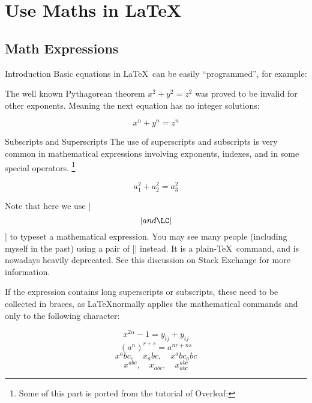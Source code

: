 \section{Use Maths in \LaTeX}

\subsection{Math Expressions}

\begin{frame}[fragile]{Introduction}
Basic equations in \LaTeX\ can be easily ``programmed'', for example: 
\begin{latexexample}
The well known Pythagorean theorem \(x^2 + y^2 = z^2\) was 
proved to be invalid for other exponents. 
Meaning the next equation has no integer solutions:

\[ x^n + y^n = z^n \]
\end{latexexample}
\end{frame}

\begin{frame}[fragile]{Subscripts and Superscripts}
The use of superscripts and subscripts is very common in mathematical expressions involving exponents, indexes, and in some special operators. \footnote[1]{Some of this part is ported from the tutorial of Overleaf: }

\begin{latexexamplesplit}
\[ a_1^2 + a_2^2 = a_3^2 \]
\end{latexexamplesplit}

Note that here we use \LC|\[| and \LC|\]| to typeset a mathematical expression. You may see many people (including myself in the past) using a pair of \LC|$$| instead. It is a plain-\TeX\ command, and is nowadays heavily deprecated. See this discussion  on Stack Exchange for more information. 

\end{frame}

\begin{frame}[fragile]

If the expression contains long superscripts or subscripts, these need to be collected in braces, as \LaTeX normally applies the mathematical commands \LC{^} and \LC{_} only to the following character:

\begin{latexexamplesplit}
\[ x^{2 \alpha} - 1 = y_{ij} + y_{ij}  \]
\[ (a^n)^{r+s} = a^{nr+ns}  \]
\[ x^abc, \quad x_abc, \quad x^abc_abc \]
\[ x^{abc}, \quad x_{abc}, \quad x^{abc}_{abc} \]
\end{latexexamplesplit}

\end{frame}

